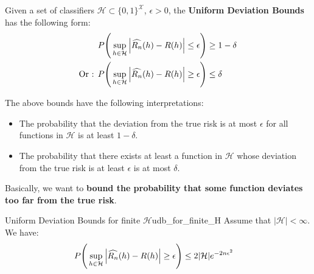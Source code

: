\begin{definition}
    Given a set of classifiers $\mathcal{H} \subset \{0,1\}^{\mathcal{X}}$, $\epsilon > 0$, the \textbf{Uniform Deviation Bounds} has the following form:
    \begin{align*}
        P\Bigg( 
            \sup_{h\in\mathcal{H}}\Big| \widehat{R_n}(h) - R(h) \Big| \le \epsilon
         \Bigg) &\ge 1 - \delta \\
        \text{Or : }
        P\Bigg( 
            \sup_{h\in\mathcal{H}}\Big| \widehat{R_n}(h) - R(h) \Big| \ge \epsilon
         \Bigg) &\le \delta
    \end{align*}

    \noindent The above bounds have the following interpretations:
    \begin{itemize}
        \item The probability that the deviation from the true risk is at most $\epsilon$ for all functions in $\mathcal{H}$ is at least $1-\delta$.
        \item The probability that there exists at least a function in $\mathcal{H}$ whose deviation from the true risk is at least $\epsilon$ is at most $\delta$.
    \end{itemize}

    \noindent Basically, we want to \textbf{bound the probability that some function deviates too far from the true risk}.
\end{definition}

\begin{proposition}{Uniform Deviation Bounds for finite $\mathcal{H}$}{udb_for_finite_H}
    Assume that $|\mathcal{H}| < \infty$. We have:
    \begin{align*}
        P\Bigg( 
            \sup_{h\in\mathcal{H}}\Big| \widehat{R_n}(h) - R(h) \Big| \ge \epsilon
         \Bigg) &\le 2|\mathcal{H}|e^{-2n\epsilon^2}
    \end{align*}
\end{proposition}

